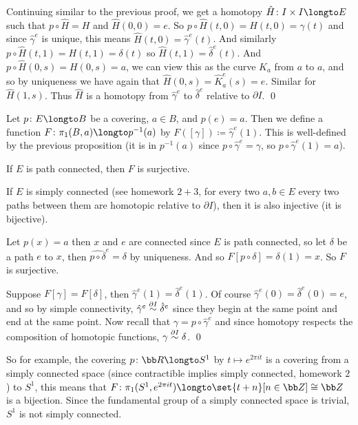 Continuing similar to the previous proof, we get a homotopy $\hat H\colon I\times I\longto E$ such that $p\circ\hat H=H$ and $\hat H(0,0)=e$.
So $p\circ\hat H(t,0)=H(t,0)=\gamma(t)$ and since $\hat\gamma^e$ is unique, this means $\hat H(t,0)=\hat\gamma^e(t)$.
And similarly $p\circ\hat H(t,1)=H(t,1)=\delta(t)$ so $\hat H(t,1)=\hat\delta^e(t)$.
And $p\circ\hat H(0,s)=H(0,s)=a$, we can view this as the curve $K_a$ from $a$ to $a$, and so by uniqueness we have again that $\hat H(0,s)=\hat K_a^e(s)=e$.
Similar for $\hat H(1,s)$.
Thus $\hat H$ is a homotopy from $\hat\gamma^e$ to $\hat\delta^e$ relative to $\partial I$.
\qed

Let $p\colon E\longto B$ be a covering, $a\in B$, and $p(e)=a$.
Then we define a function $F\colon\pi_1(B,a)\longto p^{-1}(a)$ by $F([\gamma])\coloneqq\hat\gamma^e(1)$.
This is well-defined by the previous proposition (it is in $p^{-1}(a)$ since $p\circ\hat\gamma^e=\gamma$, so $p\circ\hat\gamma^e(1)=a$).

\bprop

    \benum
        \item If $E$ is path connected, then $F$ is surjective.
        \item If $E$ is simply connected (see homework $2+3$, for every two $a,b\in E$ every two paths between them are homotopic relative to $\partial I$), then it is also injective (it is bijective).
    \eenum

\eprop

\Proof
\benum
    \item Let $p(x)=a$ then $x$ and $e$ are connected since $E$ is path connected, so let $\delta$ be a path $e$ to $x$, then $\widehat{p\circ\delta}^e=\delta$ by uniqueness.
        And so $F[p\circ\delta]=\delta(1)=x$.
        So $F$ is surjective.
    \item Suppose $F[\gamma]=F[\delta]$, then $\hat\gamma^e(1)=\hat\delta^e(1)$.
        Of course $\hat\gamma^e(0)=\hat\delta^e(0)=e$, and so by simple connectivity, $\hat\gamma^e\hdi\hat\delta^e$ since they begin at the same point and end at the same point.
        Now recall that $\gamma=p\circ\hat\gamma^e$ and since homotopy respects the composition of homotopic functions, $\gamma\hdi\delta$.
        \qed
\eenum

So for example, the covering $p\colon{\bb R}\longto S^1$ by $t\mapsto e^{2\pi it}$ is a covering from a simply connected space (since contractible implies simply connected, homework $2$) to $S^1$, this
means that $F\colon\pi_1(S^1,e^{2\pi it})\longto\set{t+n}[n\in{\bb Z}]\cong{\bb Z}$ is a bijection.
Since the fundamental group of a simply connected space is trivial, $S^1$ is not simply connected.

